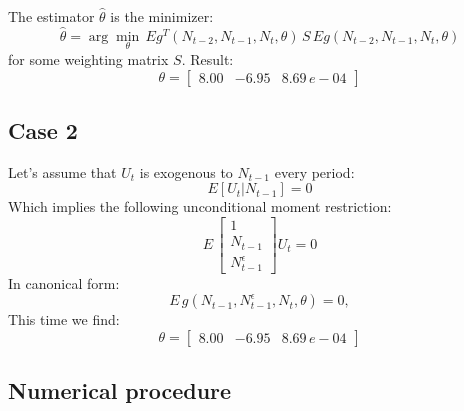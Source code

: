     The estimator $\hat \theta$ is the minimizer:
    \begin{equation}
        \hat \theta = \arg \min_{\theta} \, E g^T(N_{t-2}, N_{t-1}, N_t, \theta)  \, S \, E g(N_{t-2}, N_{t-1}, N_t, \theta)
    \end{equation}
    for some weighting matrix $S$.
    Result:
    \begin{equation}
        \theta =  \begin{bmatrix}
        8.00 &-6.95 &  8.69 \,e-04
        \end{bmatrix}     \end{equation}


    \subsection{Case 2}
    Let's assume that $U_t$ is exogenous to $N_{t-1}$ every period:
    \begin{equation}
        E[U_t|N_{t-1}] = 0
    \end{equation}
    Which implies the following unconditional moment restriction:
    \begin{equation}
        E \, \begin{bmatrix} 1  \\ N_{t-1} \\ N^{\epsilon}_{t-1} \end{bmatrix} U_t = 0
    \end{equation}
    In canonical form:
     \begin{equation}
        E \, g(N_{t-1}, N^{\epsilon}_{t-1}, N_t, \theta) = 0,
    \end{equation}
    This time we find:
    \begin{equation}
        \theta =  \begin{bmatrix}
        8.00 &-6.95 &  8.69 \,e-04
        \end{bmatrix}
    \end{equation}


    \subsection{Numerical procedure}
